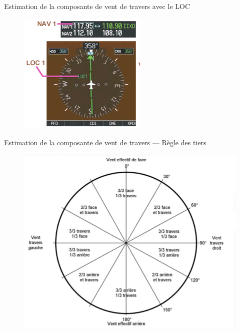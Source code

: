 \documentclass{beamer}
\begin{document}
\begin{frame}{Estimation de la composante de vent de travers avec le LOC}
  \begin{figure}
    \centering
    \includegraphics[scale=0.8]{images/loc.png}
  \end{figure}
\end{frame}

\begin{frame}{Estimation de la composante de vent de travers — Règle des tiers}
  \begin{figure}
    \centering
    \includegraphics[scale=1.2]{images/tiers.png}
  \end{figure}
\end{frame}
\end{document}
